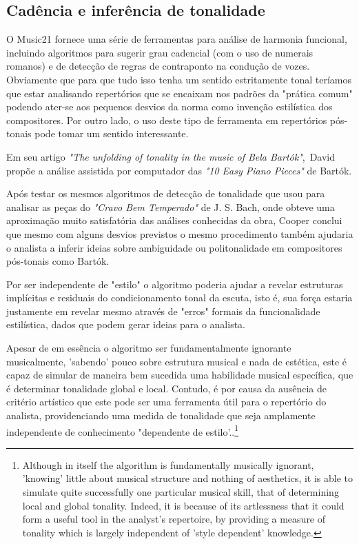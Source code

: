 \documentclass[
	12pt,				%
	openright,			%
	twoside,			%
	a4paper,			%
	english,			%
	french,				%
	spanish,			%
	brazil				%
	]{abntex2}
\begin{document}
\subsection{Cadência e inferência de tonalidade}


O Music21 fornece uma série de ferramentas para análise de harmonia funcional, incluindo algoritmos para sugerir grau cadencial (com o uso de numerais romanos) e de detecção de regras de contraponto na condução de vozes. Obviamente que para que tudo isso tenha um sentido estritamente tonal teríamos que estar analisando repertórios que se encaixam nos padrões da "prática comum"\cite[ p.354]{temperley2001cognition} podendo ater-se aos pequenos desvios da norma como invenção estilística dos compositores. Por outro lado, o uso deste tipo de ferramenta em repertórios pós-tonais pode tomar um sentido interessante. 

Em seu artigo \textit{"The unfolding of tonality in the music of Bela Bartók"},\ David  propõe a análise assistida por computador das \textit{"10 Easy Piano Pieces"} de Bartók. 

Após testar os mesmos algoritmos de detecção de tonalidade que usou para analisar as peças do \textit{"Cravo Bem Temperado"} de J. S. Bach, onde obteve uma aproximação muito satisfatória das análises conhecidas da obra, Cooper conclui que mesmo com alguns desvios previstos o mesmo procedimento também ajudaria o analista a inferir ideias sobre ambiguidade ou politonalidade em compositores pós-tonais como Bartók.

Por ser independente de "estilo" o algoritmo poderia ajudar a revelar estruturas implícitas e residuais do condicionamento tonal da escuta, isto é, sua força estaria justamente em revelar mesmo através de "erros" formais da funcionalidade estilística, dados que podem gerar ideias para o analista.

\begin{citacao}
Apesar de em essência o algoritmo ser fundamentalmente ignorante musicalmente, 'sabendo' pouco sobre estrutura musical e nada de estética, este é capaz de simular de maneira bem sucedida uma habilidade musical específica, que é determinar tonalidade global e local. Contudo, é por causa da ausência de critério artístico que este pode ser uma ferramenta útil para o repertório do analista, providenciando uma medida de tonalidade que seja amplamente independente de conhecimento "dependente de estilo'.\cite[ p.34-35]{cooper1998unfolding}.\footnote{Although in itself the algorithm is fundamentally musically ignorant, 'knowing' little about musical structure and nothing of aesthetics, it is able to simulate quite successfully one particular musical skill, that of determining local and global tonality. Indeed, it is because of its artlessness that it could form a useful tool in the analyst's repertoire, by providing a measure of tonality which is largely independent of 'style dependent' knowledge.\cite[ p.34-35]{cooper1998unfolding}}
\end{citacao}
\end{document}

